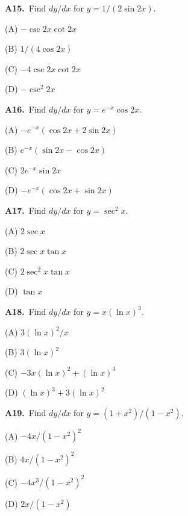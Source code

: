 \documentclass[11pt]{article}
\begin{document}
\bigskip\noindent\textbf{A15.}\ Find $dy/dx$ for $y=1/(2\sin2x)$.
\begin{list}{}{\setlength{\leftmargin}{3em}\setlength{\labelwidth}{2.5em}\setlength{\itemsep}{0pt}\setlength{\topsep}{2pt}}
\item[(A)] $-\csc2x\cot2x$
\item[(B)] $1/(4\cos2x)$
\item[(C)] $-4\csc2x\cot2x$
\item[(D)] $-\csc^2 2x$
\end{list}

\bigskip\noindent\textbf{A16.}\ Find $dy/dx$ for $y=e^{-x}\cos2x$.
\begin{list}{}{\setlength{\leftmargin}{3em}\setlength{\labelwidth}{2.5em}\setlength{\itemsep}{0pt}\setlength{\topsep}{2pt}}
\item[(A)] $-e^{-x}(\cos2x+2\sin2x)$
\item[(B)] $e^{-x}(\sin2x-\cos2x)$
\item[(C)] $2e^{-x}\sin2x$
\item[(D)] $-e^{-x}(\cos2x+\sin2x)$
\end{list}

\bigskip\noindent\textbf{A17.}\ Find $dy/dx$ for $y=\sec^2x$.
\begin{list}{}{\setlength{\leftmargin}{3em}\setlength{\labelwidth}{2.5em}\setlength{\itemsep}{0pt}\setlength{\topsep}{2pt}}
\item[(A)] $2\sec x$
\item[(B)] $2\sec x\tan x$
\item[(C)] $2\sec^2x\tan x$
\item[(D)] $\tan x$
\end{list}

\bigskip\noindent\textbf{A18.}\ Find $dy/dx$ for $y=x(\ln x)^3$.
\begin{list}{}{\setlength{\leftmargin}{3em}\setlength{\labelwidth}{2.5em}\setlength{\itemsep}{0pt}\setlength{\topsep}{2pt}}
\item[(A)] $3(\ln x)^2/x$
\item[(B)] $3(\ln x)^2$
\item[(C)] $-3x(\ln x)^2+(\ln x)^3$
\item[(D)] $(\ln x)^3+3(\ln x)^2$
\end{list}

\bigskip\noindent\textbf{A19.}\ Find $dy/dx$ for $y=(1+x^2)/(1-x^2)$.
\begin{list}{}{\setlength{\leftmargin}{3em}\setlength{\labelwidth}{2.5em}\setlength{\itemsep}{0pt}\setlength{\topsep}{2pt}}
\item[(A)] $-4x/(1-x^2)^2$
\item[(B)] $4x/(1-x^2)^2$
\item[(C)] $-4x^3/(1-x^2)^2$
\item[(D)] $2x/(1-x^2)$
\end{list}
\end{document}
